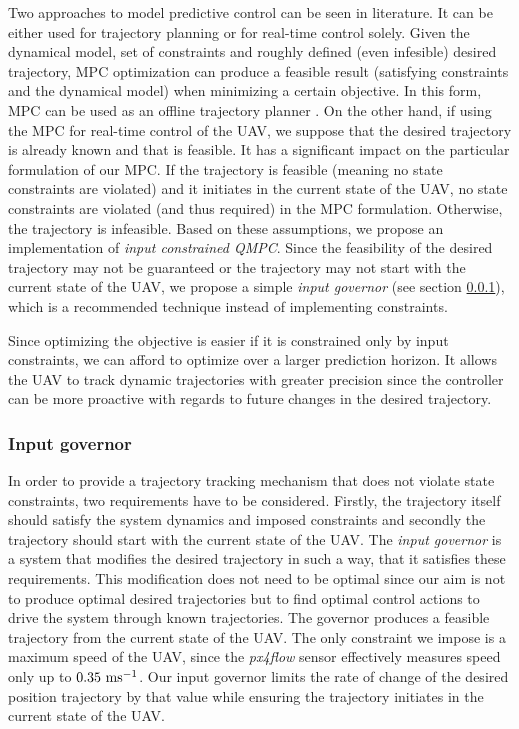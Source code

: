 Two approaches to model predictive control can be seen in literature. It can be either used for trajectory planning or for real-time control solely. Given the dynamical model, set of constraints and roughly defined (even infesible) desired trajectory, MPC optimization can produce a feasible result (satisfying constraints and the dynamical model) when minimizing a certain objective. In this form, MPC can be used as an offline trajectory planner \citep{saska2014formations}. On the other hand, if using the MPC for real-time control of the UAV, we suppose that the desired trajectory is already known and that is feasible. It has a significant impact on the particular formulation of our MPC. If the trajectory is feasible (meaning no state constraints are violated) and it initiates in the current state of the UAV, no state constraints are violated (and thus required) in the MPC formulation. Otherwise, the trajectory is infeasible. Based on these assumptions, we propose an implementation of \emph{input constrained QMPC}. Since the feasibility of the desired trajectory may not be guaranteed or the trajectory may not start with the current state of the UAV, we propose a simple \emph{input governor} (see section \ref{cap:input_governor}), which is a recommended technique \citep{rossiter2013mpcpracticalapproach} instead of implementing constraints.

Since optimizing the objective is easier if it is constrained only by input constraints, we can afford to optimize over a larger prediction horizon. It allows the UAV to track dynamic trajectories with greater precision since the controller can be more proactive with regards to future changes in the desired trajectory.  


\subsubsection{Input governor}
\label{cap:input_governor}

In order to provide a trajectory tracking mechanism that does not violate state constraints, two requirements have to be considered. Firstly, the trajectory itself should satisfy the system dynamics and imposed constraints and secondly the trajectory should start with the current state of the UAV. The \emph{input governor} is a system that modifies the desired trajectory in such a way, that it satisfies these requirements. This modification does not need to be optimal since our aim is not to produce optimal desired trajectories but to find optimal control actions to drive the system through known trajectories. The governor produces a feasible trajectory from the current state of the UAV. The only constraint we impose is a maximum speed of the UAV, since the \emph{px4flow} sensor effectively measures speed only up to $0.35~\mathrm{ms^{-1}}$. Our input governor limits the rate of change of the desired position trajectory by that value while ensuring the trajectory initiates in the current state of the UAV.

